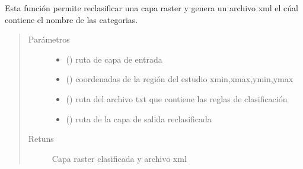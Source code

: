 \documentclass[letterpaper,10pt,spanish]{sphinxmanual}
\begin{document}

\begin{fulllineitems}
\label{\detokenize{apcsig:apcsig.reclasifica_capa}}
Esta función permite reclasificar una capa raster y genera un archivo 
xml el cúal contiene el nombre de las categorias.
\begin{quote}\begin{description}
\item[{Parámetros}] \leavevmode\begin{itemize}
\item {} 
 () \textendash{} ruta de capa de entrada

\item {} 
 () \textendash{} coordenadas de la región del estudio  xmin,xmax,ymin,ymax

\item {} 
 () \textendash{} ruta del archivo txt que contiene las reglas de clasificación

\item {} 
 () \textendash{} ruta de la capa de salida reclasificada

\end{itemize}

\item[{Retuns}] \leavevmode
Capa raster clasificada y archivo xml

\end{description}\end{quote}

\end{fulllineitems}

\end{document}
